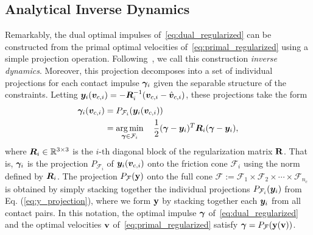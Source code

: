 \subsection{Analytical Inverse Dynamics}
\label{sec:analytical_inverse_dynamics}

Remarkably,  the dual optimal impulses of~\eqref{eq:dual_regularized} can be
constructed from the primal optimal velocities of~\eqref{eq:primal_regularized}
using a simple projection operation. Following~\cite{bib:todorov2014}, we call
this construction  \textit{inverse dynamics}. Moreover, this projection
decomposes into a set of individual projections for each contact impulse
${\bm\gamma}_i$ given the separable structure of the constraints. Letting
${\bm{y}}_i({\bm{v}}_{c,i}) = -{\bm{R}}_i^{-1}({\bm{v}}_{c,i}-\hat{{\bm{v}}}_{c,i})$,
these projections take the form
\begin{equation}
  \begin{aligned}
	\bgamma_i(\vf{v}_{c,i})&= P_{\mathcal{F}_i}(\vf{y}_i(\vf{v}_{c,i}))\\
	&= \argmin_{\bgamma\in\mathcal{F}_i} \quad 
		\frac{1}{2}(\bgamma-\vf{y}_i)^T\vf{R}_i(\bgamma-\vf{y}_i),\\
	\end{aligned}
	\label{eq:y_projection}
\end{equation}
where ${\bm{R}}_i\in\mathbb{R}^{3\times3}$ is the $i\text{-th}$ diagonal block of
the regularization matrix ${\mathbf{R}}$. That is, ${\bm\gamma}_i$ is the projection
$P_{\mathcal{F}_i}$ of ${\bm{y}}_i({\bm{v}}_{c,i})$ onto the friction cone
$\mathcal{F}_i$ using the norm defined by ${\bm{R}}_i$. The projection
$P_{\mathcal{F}}({\mathbf{y}})$ onto the full cone $\mathcal{F} := \mathcal{F}_1
\times \mathcal{F}_2 \times \cdots \times \mathcal{F}_{n_c}$ is obtained by simply
stacking together the individual projections $P_{\mathcal{F}_i}({\bm{y}}_i)$ from
Eq. (\ref{eq:y_projection}), where we form ${\mathbf{y}}$ by stacking together each
${\bm{y}}_i$ from all contact pairs.  In this notation, the optimal impulse
${\bm\gamma}$ of~\eqref{eq:dual_regularized} and the optimal velocities ${\mathbf{v}}$
of~\eqref{eq:primal_regularized} satisfy  ${\bm\gamma} =
P_{\mathcal{F}}({\mathbf{y}}({\mathbf{v}}))$.

